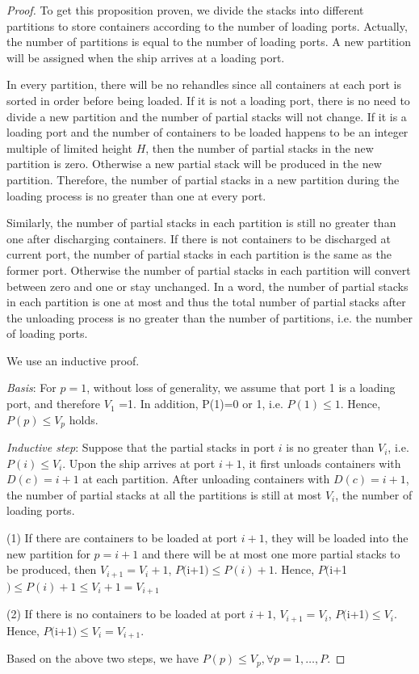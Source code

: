 \documentclass[review,3p,times,authoryear,12pt]{elsarticle}
\begin{document}
\begin{proof}

To get this proposition proven, we divide the stacks into different partitions to store containers according to the number of loading ports.
Actually, the number of partitions is equal to the number of loading ports.
A new partition will be assigned when the ship arrives at a loading port.

In every partition, there will be no rehandles since all containers at each port is sorted in order before being loaded.
If it is not a loading port, there is no need to divide a new partition and the number of partial stacks will not change.
If it is a loading port and the number of containers to be loaded happens to be an integer multiple of limited height $H$, then the number of partial stacks in the new partition is zero.
Otherwise a new partial stack will be produced in the new partition.
Therefore, the number of partial stacks in a new partition during the loading process is no greater than one at every port.

Similarly, the number of partial stacks in each partition is still no greater than one after discharging containers.
If there is not containers to be discharged at current port, the number of partial stacks in each partition is the same as the former port.
Otherwise the number of partial stacks in each partition will convert between zero and one or stay unchanged.
In a word, the number of partial stacks in each partition is one at most and thus the total number of partial stacks after the unloading process is no greater than the number of partitions, i.e. the number of loading ports.

We use an inductive proof.

\textit{Basis}: For $p=1$, without loss of generality, we assume that port 1 is a loading port, and therefore $V_1$ =1.
In addition, P(1)=0 or 1, i.e. $P(1) \le 1$. Hence, $P(p) \le V_p $ holds.

\textit{Inductive step}: Suppose that the partial stacks in port $i$ is no greater than $V_i$, i.e. $P(i) \le V_i $.
Upon the ship arrives at port $i+1$, it first unloads containers with $D(c)=i+1$ at each partition.
After unloading containers with $D(c)=i+1$, the number of partial stacks at all the partitions is still at most $V_i$, the number of loading ports.

(1) If there are containers to be loaded at port $i+1$, they will be loaded into the new partition for $p=i+1$ and there will be at most one more partial stacks to be produced, then $V_{i+1}=V_i+1$,  $P($i+1$) \le P(i)+1$. Hence, $P($i+1$) \le P(i)+1 \le V_i+1=V_{i+1}$

(2) If there is no containers to be loaded at port $i+1$,  $V_{i+1}=V_i$, $P($i+1$) \le V_i$. Hence, $P($i+1$) \le V_{i}=V_{i+1}$.

Based on the above two steps, we have $P(p) \le V_p,  \forall p=1,\ldots,P$.
\end{proof}
\end{document}
